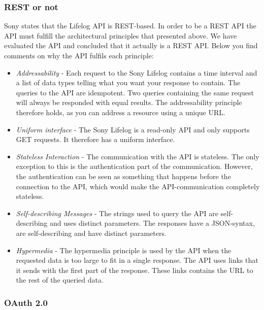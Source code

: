 \documentclass{cslthse-msc}
\begin{document}
\subsubsection{REST or not}

Sony states that the Lifelog API is REST-based. In order to be a REST API the API must fulfill the architectural principles that presented above. We have evaluated the API and concluded that it actually is a REST API. Below you find comments on why the API fulfils each principle: 

\begin{itemize}
    \item \emph{Addressability} - Each request to the Sony Lifelog contains a time interval and a list of data types telling what you want your response to contain. The queries to the API are idempotent. Two queries containing the same request will always be responded with equal results. The addressability principle therefore holds, as you can address a resource using a unique URL. 
    \item \emph{Uniform interface} - The Sony Lifelog is a read-only API and only supports GET requests. It therefore has a uniform interface.
    \item \emph{Stateless Interaction} -  The communication with the API is stateless. The only exception to this is the authentication part of the communication.
    However, the authentication can be seen as something that happens before the connection to the API, which would make the API-communication completely stateless.
    \item \emph{Self-describing Messages} - The strings used to query the API are self-describing and uses distinct parameters. The responses have a JSON-syntax, are self-describing and have distinct parameters. 
    \item \emph{Hypermedia} - The hypermedia principle is used by the API when the requested data is too large to fit in a single response. The API uses links that it sends with the first part of the response. These links contains the URL to the rest of the queried data.
\end{itemize}

\subsubsection{OAuth 2.0}
\end{document}
